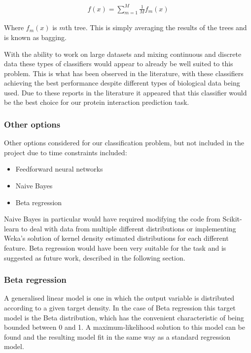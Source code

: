 \begin{align}
    f(x) = \sum_{m=1}^{M} \frac{1}{M} f_{m}(x)
\end{align}

Where $f_{m}(x)$ is $m$th tree. This is simply averaging the results of the trees and is known as bagging.

With the ability to work on large datasets and mixing continuous and discrete data these types of classifiers would appear to already be well suited to this problem.
This is what has been observed in the literature, with these classifiers achieving the best performance despite different types of biological data being used\autocites{qi_evaluation_2006,rodgers-melnick_predicting_2013}.
Due to these reports in the literature it appeared that this classifier would be the best choice for our protein interaction prediction task.


\subsubsection*{Other options}

Other options considered for our classification problem, but not included in the project due to time constraints included:

\begin{itemize}
    \item Feedforward neural networks
    \item Naive Bayes
    \item Beta regression
\end{itemize}

Naive Bayes in particular would have required modifying the code from Scikit-learn to deal with data from multiple different distributions or implementing Weka's solution of kernel density estimated distributions for each different feature\autocite{john_estimating_1995}.
Beta regression would have been very suitable for the task and is suggested as future work, described in the following section.

\subsubsection*{Beta regression}

A generalised linear model is one in which the output variable is distributed according to a given target density\autocite{murphy_machine_2012}.
In the case of Beta regression\autocite{smithson_better_2006} this target model is the Beta distribution, which has the convenient characteristic of being bounded between 0 and 1.
A maximum-likelihood solution to this model can be found and the resulting model fit in the same way as a standard regression model.

